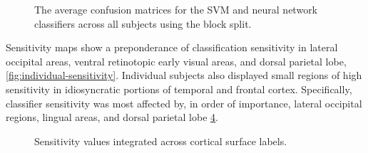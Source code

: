 \documentclass{article}
\begin{document}
\begin{figure}
\centering
\begin{subfigure}{0.4\textwidth}
\centering
\begin{adjustbox}{center}

\end{adjustbox}
\caption{}
\label{fig:average-confusion-svm}
\end{subfigure}

\begin{subfigure}{0.4\textwidth}
\centering
\begin{adjustbox}{center}

\end{adjustbox}
\caption{}
\label{fig:average-confusion-nn}
\end{subfigure}
\caption{The average confusion matrices for the  SVM and  neural network classifiers across all subjects using the block split.}
\label{fig:average-confusion}
\end{figure}

Sensitivity maps show a preponderance of classification sensitivity in lateral occipital areas, ventral retinotopic early visual areas, and dorsal parietal lobe, \ref{fig:individual-sensitivity}. 
Individual subjects also displayed small regions of high sensitivity in idiosyncratic portions of temporal and frontal cortex. 
Specifically, classifier sensitivity was most affected by, in order of importance, lateral occipital regions, lingual areas, and dorsal parietal lobe  \ref{tab:full-sensitivity}. 

\begin{figure}
\centering
\begin{adjustbox}{center}

\end{adjustbox}
\caption{Sensitivity values integrated across cortical surface labels.}
\label{tab:full-sensitivity}
\end{figure}
\end{document}
